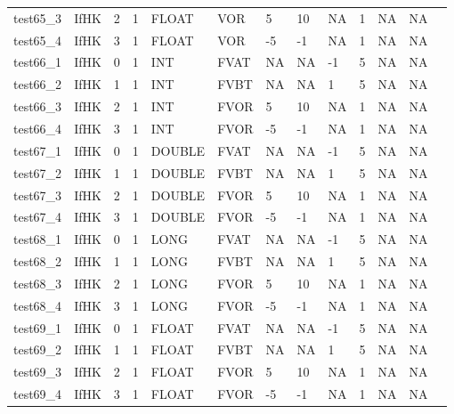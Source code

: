 \begin{longtable}{|l|l|l|p{0.5cm}|p{0.5cm}|l|p{0.5cm}|p{0.5cm}|p{0.5cm}|l|l|p{0.5cm}|l|}
test65\_3 & IfHK & 2 & 1 & FLOAT & VOR & 5 & 10 & NA & 1 & NA & NA \\
test65\_4 & IfHK & 3 & 1 & FLOAT & VOR & -5 & -1 & NA & 1 & NA & NA \\
test66\_1 & IfHK & 0 & 1 & INT & FVAT & NA & NA & -1 & 5 & NA & NA \\
test66\_2 & IfHK & 1 & 1 & INT & FVBT & NA & NA & 1 & 5 & NA & NA \\
test66\_3 & IfHK & 2 & 1 & INT & FVOR & 5 & 10 & NA & 1 & NA & NA \\
test66\_4 & IfHK & 3 & 1 & INT & FVOR & -5 & -1 & NA & 1 & NA & NA \\
test67\_1 & IfHK & 0 & 1 & DOUBLE & FVAT & NA & NA & -1 & 5 & NA & NA \\
test67\_2 & IfHK & 1 & 1 & DOUBLE & FVBT & NA & NA & 1 & 5 & NA & NA \\
test67\_3 & IfHK & 2 & 1 & DOUBLE & FVOR & 5 & 10 & NA & 1 & NA & NA \\
test67\_4 & IfHK & 3 & 1 & DOUBLE & FVOR & -5 & -1 & NA & 1 & NA & NA \\
test68\_1 & IfHK & 0 & 1 & LONG & FVAT & NA & NA & -1 & 5 & NA & NA \\
test68\_2 & IfHK & 1 & 1 & LONG & FVBT & NA & NA & 1 & 5 & NA & NA \\
test68\_3 & IfHK & 2 & 1 & LONG & FVOR & 5 & 10 & NA & 1 & NA & NA \\
test68\_4 & IfHK & 3 & 1 & LONG & FVOR & -5 & -1 & NA & 1 & NA & NA \\
test69\_1 & IfHK & 0 & 1 & FLOAT & FVAT & NA & NA & -1 & 5 & NA & NA \\
test69\_2 & IfHK & 1 & 1 & FLOAT & FVBT & NA & NA & 1 & 5 & NA & NA \\
test69\_3 & IfHK & 2 & 1 & FLOAT & FVOR & 5 & 10 & NA & 1 & NA & NA \\
test69\_4 & IfHK & 3 & 1 & FLOAT & FVOR & -5 & -1 & NA & 1 & NA & NA \\
\hline
\end{longtable}
\normalsize
